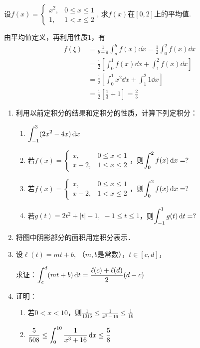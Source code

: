 \begin{example}
  设$f(x)=\begin{cases}
      x^2,& 0\le x\le 1\\
      1,& 1<x\le 2
  \end{cases}$,  求$f(x)$在$[0,2]$上的平均值.
\end{example}

\begin{solution}
由平均值定义，再利用性质1，有    
\begin{align*}
    f(\xi)&=\frac{1}{b-a}\int^b_a f(x)\dd x=\frac{1}{2}\int^2_0 f(x)\dd x\\
    &=\frac{1}{2}\left[\int^1_0 f(x)\dd x+\int^2_1 f(x)\dd x\right]\\
    &=\frac{1}{2}\left[\int^1_0 x^2\dd x+\int^2_1 1\dd x\right]\\
    &=\frac{1}{2}\left[\frac{1}{3}+1\right]=\frac{2}{3}
\end{align*}
\end{solution}

\begin{ex}
\begin{enumerate}
    \item 利用以前定积分的结果和定积分的性质，计算下列定积分：
\begin{enumerate}
    \item $\displaystyle\int^3_{-1}(2x^2-4x)\,{\rm d} x$
    \item 若$f(x)=\begin{cases}
        x,& 0\le x<1\\
        x-2,& 1\le x\le 2
    \end{cases}$，则$\displaystyle\int^2_0 f(x)\,{\rm d} x=?$
    \item 若$f(x)=\begin{cases}
        x,& 0\le x\le 1\\
        x-2,& 1< x\le 2
    \end{cases}$，则$\displaystyle\int^2_0 f(x)\,{\rm d} x=?$
\item 若$g(t)=2t^2+|t|-1,\; -1\le t\le 1$，则$\displaystyle\int^1_{-1} g(t)\,{\rm d} t=?$
\end{enumerate}

\item 将图中阴影部分的面积用定积分表示．
\item 设$\ell(t)=mt+b$, （$m,b$是常数），$t\in [c,d]$，

求证：$\displaystyle\int^d_c (mt+b)\,{\rm d} t=\dfrac{\ell(c)+\ell(d)}{2}(d-c)$
\item 证明：
\begin{enumerate}
    \item 若$0<x<10$，则$\frac{1}{1016}\le\frac{1}{x^3+16}\le \frac{1}{16}$
    \item $\dfrac{5}{508}\le \displaystyle\int^{10}_0\dfrac{1}{x^3+16}\,{\rm d} x\le \dfrac{5}{8}$
\end{enumerate}
\end{enumerate}
\end{ex}

